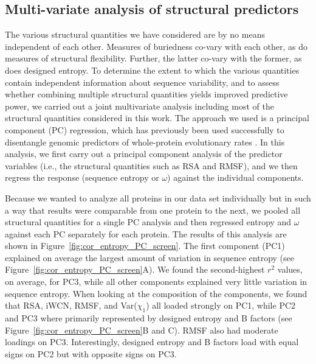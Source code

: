 \documentclass[12pt]{article}
\begin{document}
\subsection*{Multi-variate analysis of structural predictors}

The various structural quantities we have considered are by no means independent of each other. Measures of buriedness co-vary with each other, as do measures of structural flexibility. Further, the latter co-vary with the former, as does designed entropy. To determine the extent to which the various quantities contain independent information about sequence variability, and to assess whether combining multiple structural quantities yields improved predictive power, we carried out a joint multivariate analysis including most of the structural quantities considered in this work. The approach we used is a principal component (PC) regression, which has previously been used successfully to disentangle genomic predictors of whole-protein evolutionary rates \citep{Drummondetal2006,Bloometal2006}. In this analysis, we first carry out a principal component analysis of the predictor variables (i.e., the structural quantities such as RSA and RMSF), and we then regress the response (sequence entropy or $\omega$) against the individual components.

Because we wanted to analyze all proteins in our data set individually but in such a way that results were comparable from one protein to the next, we pooled all structural quantities for a single PC analysis and then regressed entropy and $\omega$ against each PC separately for each protein. The results of this analysis are shown in Figure~\ref{fig:cor_entropy_PC_screen}. The first component (PC1) explained on average the largest amount of variation in sequence entropy (see Figure~\ref{fig:cor_entropy_PC_screen}A). We found the second-highest $r^2$ values, on average, for PC3, while all other components explained very little variation in sequence entropy. When looking at the composition of the components, we found that RSA, iWCN, RMSF, and Var($\chi_1$) all loaded strongly on PC1, while PC2 and PC3 where primarily represented by designed entropy and B factors (see Figure~\ref{fig:cor_entropy_PC_screen}B and C). RMSF also had moderate loadings on PC3. Interestingly, designed entropy and B factors load with equal signs on PC2 but with opposite signs on PC3.
\end{document}
